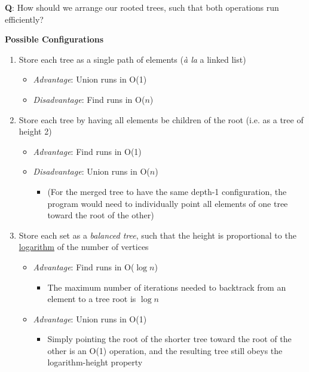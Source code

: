 \documentclass[12pt]{extarticle}
\theoremstyle{definition}
\theoremstyle{remark}
\begin{document}
\vspace{8pt}
\noindent\textbf{Q}: How should we arrange our rooted trees, such that both operations run efficiently?

\vspace{10pt}
\noindent\textbf{Possible Configurations}
\begin{enumerate}
    \item Store each tree as a single path of elements (\textit{\`{a} la} a linked list) \begin{itemize}
        \item \textit{Advantage}: Union runs in O(1)
        \item \textit{Disadvantage}: Find runs in O($n$)
    \end{itemize}
    \item Store each tree by having all elements be children of the root (i.e. as a tree of height 2) \begin{itemize}
        \item \textit{Advantage}: Find runs in O(1)
        \item\textit{Disadvantage}: Union runs in O($n$) \begin{itemize}
            \item (For the merged tree to have the same depth-1 configuration, the program would need to individually point all elements of one tree toward the root of the other)
        \end{itemize}
    \end{itemize}
    \item Store each set as a \textit{balanced tree}, such that the height is proportional to the \ul{logarithm} of the number of vertices \begin{itemize}
        \item \textit{Advantage}: Find runs in O($\log n$) \begin{itemize}
            \item The maximum number of iterations needed to backtrack from an element to a tree root is $\log n$
        \end{itemize}
        \item \textit{Advantage}: Union runs in O(1) \begin{itemize}
            \item Simply pointing the root of the shorter tree toward the root of the other is an O(1) operation, and the resulting tree still obeys the logarithm-height property
        \end{itemize}
    \end{itemize}
\end{enumerate}
\end{document}
